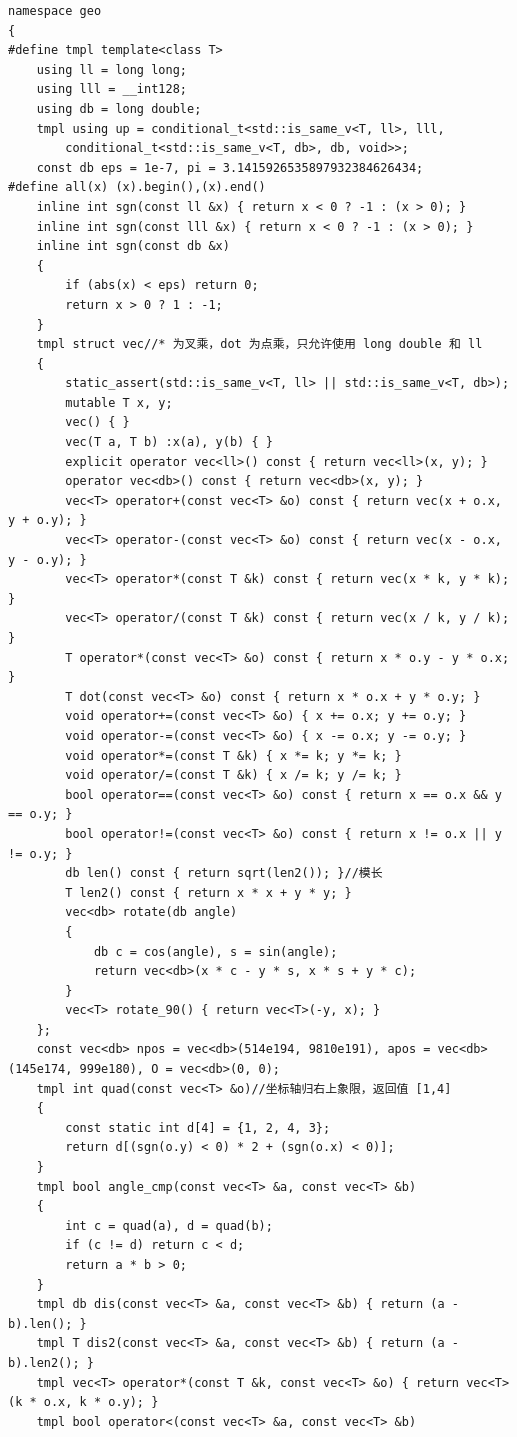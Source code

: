\documentclass[12pt]{ctexart}
\begin{document}
\begin{lstlisting}
namespace geo
{
#define tmpl template<class T>
	using ll = long long;
	using lll = __int128;
	using db = long double;
	tmpl using up = conditional_t<std::is_same_v<T, ll>, lll,
		conditional_t<std::is_same_v<T, db>, db, void>>;
	const db eps = 1e-7, pi = 3.1415926535897932384626434;
#define all(x) (x).begin(),(x).end()
	inline int sgn(const ll &x) { return x < 0 ? -1 : (x > 0); }
	inline int sgn(const lll &x) { return x < 0 ? -1 : (x > 0); }
	inline int sgn(const db &x)
	{
		if (abs(x) < eps) return 0;
		return x > 0 ? 1 : -1;
	}
	tmpl struct vec//* 为叉乘，dot 为点乘，只允许使用 long double 和 ll
	{
		static_assert(std::is_same_v<T, ll> || std::is_same_v<T, db>);
		mutable T x, y;
		vec() { }
		vec(T a, T b) :x(a), y(b) { }
		explicit operator vec<ll>() const { return vec<ll>(x, y); }
		operator vec<db>() const { return vec<db>(x, y); }
		vec<T> operator+(const vec<T> &o) const { return vec(x + o.x, y + o.y); }
		vec<T> operator-(const vec<T> &o) const { return vec(x - o.x, y - o.y); }
		vec<T> operator*(const T &k) const { return vec(x * k, y * k); }
		vec<T> operator/(const T &k) const { return vec(x / k, y / k); }
		T operator*(const vec<T> &o) const { return x * o.y - y * o.x; }
		T dot(const vec<T> &o) const { return x * o.x + y * o.y; }
		void operator+=(const vec<T> &o) { x += o.x; y += o.y; }
		void operator-=(const vec<T> &o) { x -= o.x; y -= o.y; }
		void operator*=(const T &k) { x *= k; y *= k; }
		void operator/=(const T &k) { x /= k; y /= k; }
		bool operator==(const vec<T> &o) const { return x == o.x && y == o.y; }
		bool operator!=(const vec<T> &o) const { return x != o.x || y != o.y; }
		db len() const { return sqrt(len2()); }//模长
		T len2() const { return x * x + y * y; }
		vec<db> rotate(db angle)
		{
			db c = cos(angle), s = sin(angle);
			return vec<db>(x * c - y * s, x * s + y * c);
		}
		vec<T> rotate_90() { return vec<T>(-y, x); }
	};
	const vec<db> npos = vec<db>(514e194, 9810e191), apos = vec<db>(145e174, 999e180), O = vec<db>(0, 0);
	tmpl int quad(const vec<T> &o)//坐标轴归右上象限，返回值 [1,4]
	{
		const static int d[4] = {1, 2, 4, 3};
		return d[(sgn(o.y) < 0) * 2 + (sgn(o.x) < 0)];
	}
	tmpl bool angle_cmp(const vec<T> &a, const vec<T> &b)
	{
		int c = quad(a), d = quad(b);
		if (c != d) return c < d;
		return a * b > 0;
	}
	tmpl db dis(const vec<T> &a, const vec<T> &b) { return (a - b).len(); }
	tmpl T dis2(const vec<T> &a, const vec<T> &b) { return (a - b).len2(); }
	tmpl vec<T> operator*(const T &k, const vec<T> &o) { return vec<T>(k * o.x, k * o.y); }
	tmpl bool operator<(const vec<T> &a, const vec<T> &b)

\end{lstlisting}
\end{document}
